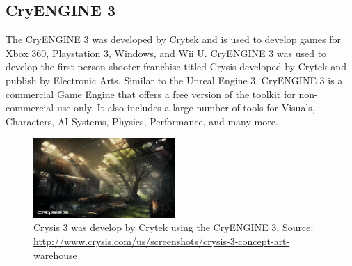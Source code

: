 \subsection{CryENGINE 3}
The CryENGINE 3 was developed by Crytek and is used to develop games for Xbox 360, Playstation 3, Windows, and Wii U. CryENGINE 3 was used to develop the first person shooter franchise titled Crysis developed by Crytek and publish by Electronic Arts. Similar to the Unreal Engine 3, CryENGINE 3 is a commercial Game Engine that offers a free version of the toolkit for non-commercial use only. It also includes a large number of tools for Visuals, Characters, AI Systems, Physics, Performance, and many more.
\begin{figure}[h!]
  \centering \includegraphics[width=0.48\textwidth]{Images/Crysis3_Fields_Warehouse_ConceptArt.png}
	\caption{Crysis 3 was develop by Crytek using the CryENGINE 3. Source: \url{http://www.crysis.com/us/screenshots/crysis-3-concept-art-warehouse}}
\end{figure}

